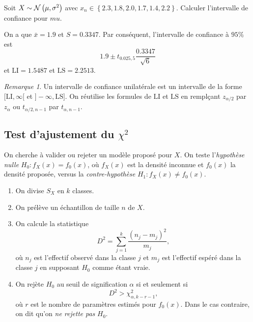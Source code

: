 \documentclass[11pt]{article}
\newcommand\Norm[2]{%
	\ensuremath{%
		\mathcal{N}\left(#1,#2\right)%
	}%
}%
\theoremstyle{remark}
\newtheorem*{remark}{Remarque}
\theoremstyle{definition}
\begin{document}
\begin{exemple}
	Soit $X\sim\Norm{\mu}{\sigma^2}$ avec $x_n\in\left\{2.3,1.8,2.0,1.7,1.4,2.2
	\right\}$. Calculer l'intervalle de confiance pour $mu$.

	On a que $\bar{x}=1.9$ et $S=0.3347$. Par conséquent, l'intervalle de
	confiance à $95\%$ est
	\begin{equation*}
		1.9\pm t_{0.025,5}\frac{0.3347}{\sqrt{6}}
	\end{equation*}
	et $\mathrm{LI}=1.5487$ et $\mathrm{LS}=2.2513$.
\end{exemple}

\begin{remark}
	Un intervalle de confiance unilatérale est un intervalle de la forme
	$[\mathrm{LI},\infty[$ et $]-\infty,\mathrm{LS}]$. On réutilise les
	formules de $\mathrm{LI}$ et $\mathrm{LS}$ en remplçant $z_{\alpha/2}$
	par $z_\alpha$ ou $t_{\alpha/2,n-1}$ par $t_{\alpha,n-1}$.
\end{remark}

\subsection{Test d'ajustement du \boldmath $\chi^2$}
On cherche à valider ou rejeter un modèle proposé pour $X$. On teste
l'\textit{hypothèse nulle} $H_0:f_X(x)=f_0(x)$, où $f_X(x)$ est la densité
inconnue et $f_0(x)$ la densité proposée, versus la \textit{contre-hypothèse}
$H_1:f_X(x)\neq f_0(x)$.

\begin{enumerate}
	\item On divise $S_X$ en $k$ classes.
	\item On prélève un échantillon de taille $n$ de $X$.
	\item On calcule la statistique 
		  \begin{equation*}
		  	  D^2=\displaystyle\sum_{j=1}^k\dfrac{\left(n_j-m_j\right)^2}{m_j},
		  \end{equation*}
	      où $n_j$ est l'effectif observé dans la classe $j$ et $m_j$ est
		  l'effectif espéré dans la classe $j$ en supposant $H_0$ comme étant
		  vraie.
	\item On rejète $H_0$ au seuil de signification $\alpha$ si et seulement si
	      \begin{equation*}
	          D^2>\chi^2_{\alpha,k-r-1},
		  \end{equation*}
		  où $r$ est le nombre de paramètres estimés pour $f_0(x)$. Dans le cas
		  contraire, on dit qu'on \textit{ne rejette pas} $H_0$.
\end{enumerate}
\end{document}

